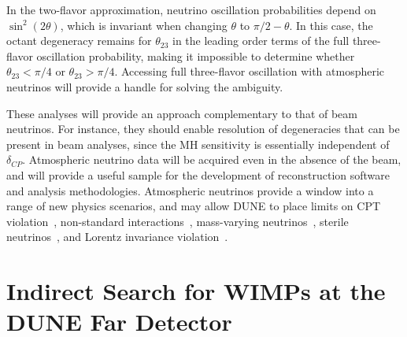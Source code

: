 In the two-flavor approximation, neutrino oscillation probabilities depend on 
$\sin^2(2\theta)$, which is invariant when changing $\theta$ to $\pi/2-\theta$. In this case, the octant 
degeneracy remains for $\theta_{23}$ in the leading order terms of the full 
three-flavor oscillation probability, making it impossible to determine whether $\theta_{23}< \pi/4$ or 
$\theta_{23}> \pi/4$. Accessing full three-flavor oscillation with atmospheric neutrinos 
will provide a handle for solving the ambiguity.




These analyses will provide an approach complementary to that of beam neutrinos. 
For instance, they should enable resolution of 
degeneracies that can be present in beam analyses, since %
the MH sensitivity is essentially independent of $\delta_{CP}$.   Atmospheric neutrino data will be acquired 
even in the absence of the beam, and will provide a useful sample for the development of 
reconstruction software and analysis methodologies.  
Atmospheric neutrinos provide a window into a range of new physics scenarios, and %
may allow DUNE to place limits on CPT violation~\cite{Kostelecky:2003cr}, 
non-standard interactions~\cite{Chatterjee:2014gxa}, mass-varying neutrinos~\cite{Abe:2008zza}, 
sterile neutrinos~\cite{Abe:2014gda}, and
Lorentz invariance violation~\cite{Kostelecky:2011gq}.

\section{Indirect Search for WIMPs at the DUNE Far Detector}

